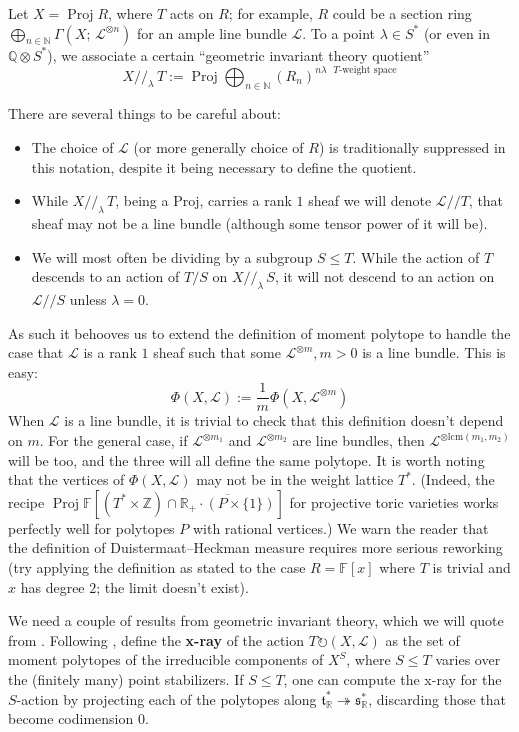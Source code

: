 \documentclass[10pt,a4paper]{amsart}
\DeclareMathOperator{\Proj}{Proj}
\newcommand{\RR}{\mathbb{R}}
\newcommand{\ZZ}{\mathbb{Z}}
\newcommand{\NN}{\mathbb{N}}
\newcommand\defn[1]{{\bf #1}}
\newcommand\Oplus\bigoplus
\newcommand\lie[1]{{\mathfrak #1}}
\newcommand\FF{{\mathbb F}}
\newcommand\QQ{{\mathbb Q}}
\newcommand\tensor\otimes
\newcommand\calL{{\mathcal L}}
\newcommand\onto\twoheadrightarrow
\newcommand\junk[1]{}
\newcommand\actson\circlearrowright
\begin{document}
Let $X = \Proj R$, where $T$ acts on $R$; for example, $R$ could be
a section ring $\Oplus_{n\in\NN} \Gamma(X;\, \calL^{\tensor n})$ for an
ample line bundle $\calL$.
To a point $\lambda \in S^*$ (or even in $\QQ\tensor S^*$), 
we associate a certain ``geometric invariant theory quotient''
\[ X//_\lambda\, T := \Proj \Oplus_{n\in\NN} (R_n)^{\text{$n\lambda$ $T$-weight space}} \]
\junk{
  carrying a $T/S$-action. (The definition doesn't depend on the larger
  torus $T$ containing $S$, but we will most often use it in the setting
  where there is a larger torus.) }
There are several things to be careful about:
\begin{itemize}
\item The choice of $\calL$ (or more generally choice of $R$) is
  traditionally suppressed in this notation, despite it being
  necessary to define the quotient.
\item While $X//_\lambda\, T$, being a $\mathrm{Proj}$, carries a rank $1$ sheaf
  we will denote $\calL // T$,
  that sheaf may not be a line bundle (although some tensor power of it
  will be). 
\item We will most often be dividing by a subgroup $S\leq T$.
  While the action of $T$ descends to an action of $T/S$ on
  $X//_\lambda\, S$, it will not descend to an action on $\calL//S$
  unless $\lambda = 0$.
\end{itemize}
As such it behooves us to extend the definition of moment polytope
to handle the case that $\calL$ is a rank $1$ sheaf such that
some $\calL^{\tensor m}, m>0$ is a line bundle. This is easy:
\[ \Phi(X,\calL) := \frac{1}{m} \Phi(X,\calL^{\tensor m}) \]
When $\calL$ is a line bundle,
it is trivial to check that this definition doesn't depend on $m$.
For the general case, if $\calL^{\tensor m_1}$ and $\calL^{\tensor m_2}$ are
line bundles, then $\calL^{\tensor \mathrm{lcm}(m_1,m_2)}$ will be too,
and the three will all define the same polytope. It is worth noting
that the vertices of $\Phi(X,\calL)$ may not be in the weight lattice $T^*$.
(Indeed, the recipe $\Proj \FF\left[(T^* \times \ZZ) \cap
  \overline{\RR_+\cdot (P \times \{1\})}\right]$ for projective toric varieties
works perfectly well for polytopes $P$ with rational vertices.)
We warn the reader that the definition of Duistermaat--Heckman measure
requires more serious reworking (try applying the definition as stated
to the case $R = \FF[x]$ where $T$ is trivial and $x$ has degree $2$;
the limit doesn't exist).

We need a couple of results from geometric invariant theory, which
we will quote from \cite{brion1990action,dolgachev1998variation}.
Following \cite{tolman1998examples},
define the \defn{x-ray} of the action $T\actson (X,\calL)$ as the set
of moment polytopes of the irreducible components of $X^S$, where $S \leq T$
varies over the (finitely many) point stabilizers.
If $S\leq T$, one can compute the x-ray for the $S$-action
by projecting each of the polytopes along $\lie t^*_\RR \onto \lie s^*_\RR$,
discarding those that become codimension $0$. 
\end{document}
